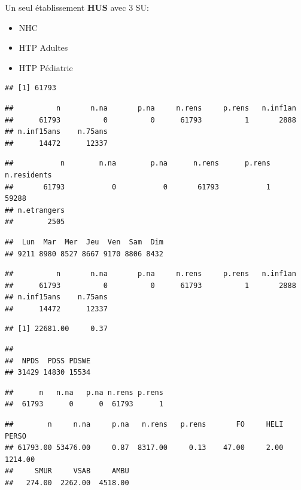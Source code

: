 \documentclass[]{article}
\begin{document}
Un seul établissement \textbf{HUS} avec 3 SU:

\begin{itemize}
\itemsep1pt\parskip0pt
\item
  NHC
\item
  HTP Adultes
\item
  HTP Pédiatrie
\end{itemize}

\begin{verbatim}
## [1] 61793
\end{verbatim}

\begin{verbatim}
##          n       n.na       p.na     n.rens     p.rens   n.inf1an 
##      61793          0          0      61793          1       2888 
## n.inf15ans    n.75ans 
##      14472      12337
\end{verbatim}

\begin{verbatim}
##           n        n.na        p.na      n.rens      p.rens n.residents 
##       61793           0           0       61793           1       59288 
## n.etrangers 
##        2505
\end{verbatim}

\begin{verbatim}
##  Lun  Mar  Mer  Jeu  Ven  Sam  Dim 
## 9211 8980 8527 8667 9170 8806 8432
\end{verbatim}

\begin{verbatim}
##          n       n.na       p.na     n.rens     p.rens   n.inf1an 
##      61793          0          0      61793          1       2888 
## n.inf15ans    n.75ans 
##      14472      12337
\end{verbatim}

\begin{verbatim}
## [1] 22681.00     0.37
\end{verbatim}

\begin{verbatim}
## 
##  NPDS  PDSS PDSWE 
## 31429 14830 15534
\end{verbatim}

\begin{verbatim}
##      n   n.na   p.na n.rens p.rens 
##  61793      0      0  61793      1
\end{verbatim}

\begin{verbatim}
##        n     n.na     p.na   n.rens   p.rens       FO     HELI    PERSO 
## 61793.00 53476.00     0.87  8317.00     0.13    47.00     2.00  1214.00 
##     SMUR     VSAB     AMBU 
##   274.00  2262.00  4518.00
\end{verbatim}
\end{document}
